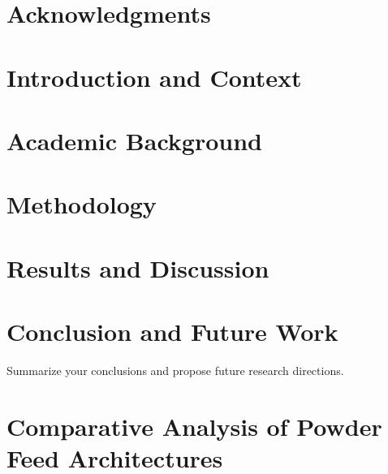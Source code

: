 \documentclass[11pt,a4paper]{report}
\begin{document}
\begin{abstract}

\end{abstract}

\chapter*{Acknowledgments}


\tableofcontents
\listoffigures
\listoftables

\newpage

\clearpage
{}

\chapter{Introduction and Context}


\chapter{Academic Background}


\chapter{Methodology}


\chapter{Results and Discussion}


\chapter{Conclusion and Future Work}
Summarize your conclusions and propose future research directions.

\newpage

\appendix

\chapter{Comparative Analysis of Powder Feed Architectures}
\label{appendix:feed-architecture-analysis}
\end{document}
